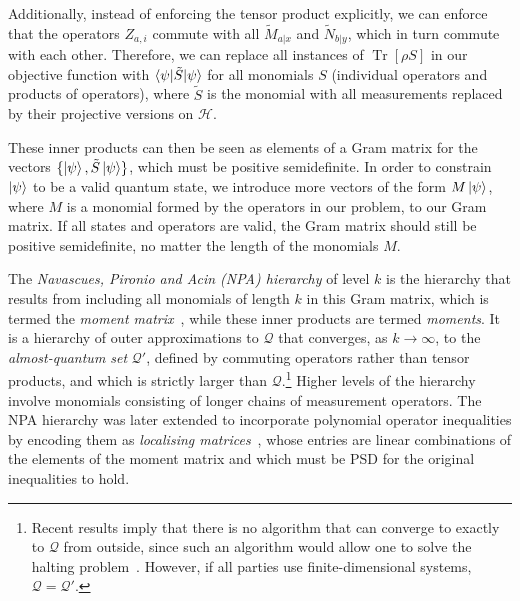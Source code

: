 \documentclass[10pt, a4paper]{article}
\numberwithin{equation}{section} %
\theoremstyle{definition}
\theoremstyle{plain}
\newcommand{\?}{\mathrel{?}} %
\newcommand{\Tr}[2][]{\mathop{\mathrm{Tr}#1}\left[ #2 \right]} %
\newcommand{\Hs}{\mathcal{H}} %
\newcommand{\Qs}{\mathcal{Q}}
\begin{document}
        Additionally, instead of enforcing the tensor product explicitly, we can enforce that the operators \(Z_{a,i}\) commute with all \(\tilde{M}_{a|x}\) and \(\tilde{N}_{b|y}\), which in turn commute with each other. Therefore, we can replace all instances of \(\Tr{\rho S}\) in our objective function with \(\braket{\psi|\tilde{S}|\psi}\) for all monomials \(S\) (individual operators and products of operators), where \(\tilde{S}\) is the monomial with all measurements replaced by their projective versions on \(\Hs\). 

        These inner products can then be seen as elements of a Gram matrix for the vectors \(\{\ket{\psi}, \tilde{S}\ket{\psi}\}\), which must be positive semidefinite. In order to constrain \(\ket{\psi}\) to be a valid quantum state, we introduce more vectors of the form \(M\ket{\psi}\), where \(M\) is a monomial formed by the operators in our problem, to our Gram matrix. If all states and operators are valid, the Gram matrix should still be positive semidefinite, no matter the length of the monomials \(M\).

        The \emph{Navascues, Pironio and Acin (NPA) hierarchy} of level \(k\) is the hierarchy that results from including all monomials of length \(k\) in this Gram matrix, which is termed the \emph{moment matrix}~\cite{BoundingQ, ConvHierQ}, while these inner products are termed \emph{moments}. It is a hierarchy of outer approximations to \(\Qs\) that converges, as \(k\to\infty\), to the \emph{almost-quantum set} \(\Qs'\), defined by commuting operators rather than tensor products, and which is strictly larger than \(\Qs\).\footnote{Recent results imply that there is no algorithm that can converge to exactly to \(\Qs\) from outside, since such an algorithm would allow one to solve the halting problem~\cite{MIPRE}. However, if all parties use finite-dimensional systems, \(\Qs = \Qs'\).} Higher levels of the hierarchy involve monomials consisting of longer chains of measurement operators. The NPA hierarchy was later extended to incorporate polynomial operator inequalities by encoding them as \emph{localising matrices}~\cite{NPAHierarchy}, whose entries are linear combinations of the elements of the moment matrix and which must be PSD for the original inequalities to hold.
\end{document}
